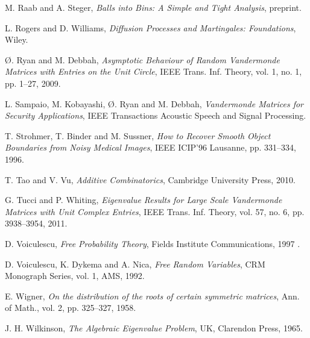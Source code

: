 \documentclass[smallextended]{svjour3}
\begin{document}
\begin{thebibliography}{}
M. Raab and A. Steger, {\it Balls into Bins: A Simple and Tight Analysis}, preprint.

L. Rogers and D. Williams, 
{\it Diffusion Processes and Martingales: Foundations}, Wiley. 

\O. Ryan and M. Debbah, {\it Asymptotic Behaviour of Random Vandermonde Matrices with Entries on the Unit Circle}, IEEE Trans. Inf. Theory, vol. 1, no. 1, pp. 1--27, 2009.

L. Sampaio, M. Kobayashi, \O. Ryan and M. Debbah,
{\it Vandermonde Matrices for Security Applications}, IEEE Transactions Acoustic Speech and  Signal Processing.

T. Strohmer, T. Binder and M. Sussner,
{\it How to Recover Smooth Object Boundaries from Noisy Medical Images}, IEEE ICIP'96 Lausanne, pp. 331--334, 1996.

 T. Tao and V. Vu, {\it Additive Combinatorics}, Cambridge University Press, 2010. 

G. Tucci and P. Whiting, {\it Eigenvalue Results for Large Scale Vandermonde Matrices with Unit Complex Entries}, IEEE Trans. Inf. Theory, vol. 57, no. 6, pp. 3938--3954, 2011.

 D. Voiculescu, {\it Free Probability Theory}, Fields Institute Communications, 1997 .

 D. Voiculescu, K. Dykema and A. Nica, {\it Free Random Variables}, CRM Monograph Series, vol. 1, AMS, 1992.

 E. Wigner, {\it On the distribution of the roots of certain symmetric matrices},  Ann. of Math., vol. 2, pp.  325--327, 1958.

 J. H. Wilkinson, {\it The Algebraic Eigenvalue Problem},  UK, Clarendon Press, 1965.

\end{thebibliography}
\end{document}
